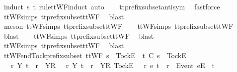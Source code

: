 \begin{isabellebody}
\ {\isacharparenleft}induct\ s\ t\ rule{\isacharcolon}ttWF{}{\isachardot}induct{\isacharcomma}\ auto{\isacharparenright}\isanewline
\ \ \isamarkupfalse%
\ tt{\isacharunderscore}prefix{\isacharunderscore}subset{\isacharunderscore}antisym\ \isamarkupfalse%
\ fastforce\isanewline
\ \ \isamarkupfalse%
\ ttWF{\isachardot}simps{\isacharparenleft}{}{}{\isacharparenright}\ tt{\isacharunderscore}prefix{\isacharunderscore}subset{\isacharunderscore}ttWF\ \isamarkupfalse%
\ blast\isanewline
\ \ \isamarkupfalse%
\ {\isacharparenleft}meson\ ttWF{\isachardot}simps{\isacharparenleft}{}{}{\isacharparenright}\ tt{\isacharunderscore}prefix{\isacharunderscore}subset{\isacharunderscore}ttWF{\isacharparenright}\isanewline
\ \ \isamarkupfalse%
\ ttWF{\isachardot}simps{\isacharparenleft}{}{}{\isacharparenright}\ tt{\isacharunderscore}prefix{\isacharunderscore}subset{\isacharunderscore}ttWF\ \isamarkupfalse%
\ blast\isanewline
\ \ \isamarkupfalse%
\ ttWF{\isachardot}simps{\isacharparenleft}{}{\isacharparenright}\ tt{\isacharunderscore}prefix{\isacharunderscore}subset{\isacharunderscore}ttWF\ \isamarkupfalse%
\ blast\isanewline
\ \ \isamarkupfalse%
\ ttWF{\isachardot}simps{\isacharparenleft}{}{\isacharparenright}\ tt{\isacharunderscore}prefix{\isacharunderscore}subset{\isacharunderscore}ttWF\ \isamarkupfalse%
\ blast%
\endisatagproof
{\isafoldproof}%
%
\isadelimproof
\isanewline
%
\endisadelimproof
\isanewline
{}\isamarkupfalse%
\ ttWF{\isacharunderscore}end{\isacharunderscore}Tock{\isacharunderscore}prefix{\isacharunderscore}subset{\isacharcolon}\ {\isachardoublequoteopen}ttWF\ {\isacharparenleft}s\ {\isacharat}\ {\isacharbrackleft}{\isacharbrackleft}Tock{\isacharbrackright}\isactrlsub E{\isacharbrackright}{\isacharparenright}\ {\isasymLongrightarrow}\ t\ {\isasymlesssim}\isactrlsub C\ s\ {\isacharat}\ {\isacharbrackleft}{\isacharbrackleft}Tock{\isacharbrackright}\isactrlsub E{\isacharbrackright}\ {\isasymLongrightarrow}\ \isanewline
\ \ {\isacharparenleft}{\isasymexists}\ r\ Y{\isachardot}\ t\ {\isacharequal}\ r\ {\isacharat}\ {\isacharbrackleft}{\isacharbrackleft}Y{\isacharbrackright}\isactrlsub R{\isacharbrackright}{\isacharparenright}\ {\isasymor}\ {\isacharparenleft}{\isasymexists}\ r\ Y{\isachardot}\ t\ {\isacharequal}\ r\ {\isacharat}\ {\isacharbrackleft}{\isacharbrackleft}Y{\isacharbrackright}\isactrlsub R{\isacharcomma}\ {\isacharbrackleft}Tock{\isacharbrackright}\isactrlsub E{\isacharbrackright}{\isacharparenright}\ {\isasymor}\ {\isacharparenleft}{\isasymexists}\ r\ e{\isachardot}\ t\ {\isacharequal}\ r\ {\isacharat}\ {\isacharbrackleft}{\isacharbrackleft}Event\ e{\isacharbrackright}\isactrlsub E{\isacharbrackright}{\isacharparenright}\ {\isasymor}\ t\ {\isacharequal}\ {\isacharbrackleft}{\isacharbrackright}{\isachardoublequoteclose}\isanewline

\end{isabellebody}
